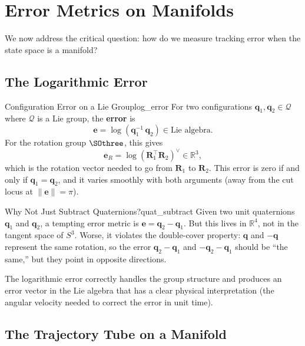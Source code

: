\documentclass[12pt, openany]{book}
\theoremstyle{plain}
\newcommand{\configspace}{\mathcal{Q}}
\newcommand{\Reals}{\mathbb{R}}
\newcommand{\norm}[1]{\left\lVert #1 \right\rVert}
\begin{document}
\section{Error Metrics on Manifolds}

We now address the critical question: how do we measure tracking error when
the state space is a manifold?

\subsection{The Logarithmic Error}

\begin{definition}{Configuration Error on a Lie Group}{log_error}
  For two configurations $\bm{q}_1, \bm{q}_2 \in \configspace$ where
  $\configspace$ is a Lie group, the \textbf{error} is
  \begin{equation}\label{eq:log_error}
    \bm{e} = \log(\bm{q}_1^{-1}\, \bm{q}_2) \in \text{Lie algebra}.
  \end{equation}
  For the rotation group $\SOthree$, this gives
  \begin{equation}
    \bm{e}_R = \log(\bm{R}_1^\top \bm{R}_2)^\vee \in \Reals^3,
  \end{equation}
  which is the rotation vector needed to go from $\bm{R}_1$ to $\bm{R}_2$.
  This error is zero if and only if $\bm{q}_1 = \bm{q}_2$, and it varies
  smoothly with both arguments (away from the cut locus at $\norm{\bm{e}} = \pi$).
\end{definition}

\begin{remark}{Why Not Just Subtract Quaternions?}{quat_subtract}
  Given two unit quaternions $\bm{q}_1$ and $\bm{q}_2$, a tempting error
  metric is $\bm{e} = \bm{q}_2 - \bm{q}_1$. But this lives in $\Reals^4$,
  not in the tangent space of $S^3$. Worse, it violates the double-cover
  property: $\bm{q}$ and $-\bm{q}$ represent the same rotation, so the
  error $\bm{q}_2 - \bm{q}_1$ and $-\bm{q}_2 - \bm{q}_1$ should be
  ``the same,'' but they point in opposite directions.

  The logarithmic error correctly handles the group structure and produces
  an error vector in the Lie algebra that has a clear physical interpretation
  (the angular velocity needed to correct the error in unit time).
\end{remark}

\subsection{The Trajectory Tube on a Manifold}
\end{document}
